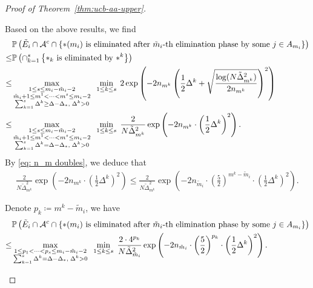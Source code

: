 \documentclass[11pt]{article}
\begin{document}
\begin{proof}[Proof of Theorem~\ref{thm:ucb-aa-upper}]
\begin{itemize}
Based on the above results, we find
\begin{align}
&\mathbb{P}\left(\tilde{E}_i\cap\mathcal{A}^c\cap\left\{\text{$*(m_i)$ is eliminated after $\tilde{m}_i$-th elimination phase } \text{by some }j\in A_{m_i}\right\}\right)\notag\\
    \leq &\mathbb{P}\left(\cap_{k=1}^{s} \left\{\text{$*_k$ is eliminated by $*^k$}\right\} \right)\notag\\
    \leq &\max_{\substack{1\leq s\leq m_i-\tilde{m}_i-2\\\tilde{m}_i+1\leq m^1<\cdots <m^{s}\leq m_i-2\\ \sum _{k=1}^{s}\Delta^k\geq \Delta-\Delta_*,\; \Delta^k>0}}\;\;\min_{1\leq k\leq s}\;2\exp\left(-2n_{m^k}\left(\frac{1}{2}\Delta^k +\sqrt{\frac{\log(N \tilde{\Delta}_{m^k}^2)}{2n_{m^k}}}\right)^2\right)\notag\\
    \leq & \max_{\substack{1\leq s\leq m_i-\tilde{m}_i-2\\\tilde{m}_i+1\leq m^1<\cdots <m^{s}\leq m_i-2\\ \sum _{k=1}^{s}\Delta^k= \Delta-\Delta_*,\; \Delta^k>0}}\;\;\min_{1\leq k\leq s}\;\frac{2}{N\tilde{\Delta}_{m^k}^2}\exp\left(-2n_{m^k}\cdot \left(\frac{1}{2}\Delta^{k}\right)^2\right).
    \label{eq: A-3 G-3 b2 optimization problem}
\end{align}
By \eqref{eq: n_m doubles}, we deduce that
\begin{align*}
    \frac{2}{N\tilde{\Delta}_{m^k}^2}\exp\left(-2n_{m^k}\cdot \left(\frac{1}{2}\Delta^{k}\right)^2\right)\leq \frac{2}{N\tilde{\Delta}_{m^k}^2}\exp\left(-2n_{\tilde{m}_i}\cdot \left(\frac{5}{2}\right)^{m^k-\tilde{m}_i}\cdot \left(\frac{1}{2}\Delta^{k}\right)^2\right).
\end{align*}

Denote $p_k\coloneqq m^k-\tilde{m}_i$, we have
\begin{align}
&\mathbb{P}\left(\tilde{E}_i\cap\mathcal{A}^c\cap\left\{\text{$*(m_i)$ is eliminated after $\tilde{m}_i$-th elimination phase } \text{by some }j\in A_{m_i}\right\}\right)\notag\\
    \leq &\max_{\substack{1\leq p_1<\cdots <p_{s}\leq m_i-\tilde{m}_i-2\\ \sum _{k=1}^{s}\Delta^k= \Delta-\Delta_*,\; \Delta^k>0}}\;\;\min_{1\leq k\leq s}\;\frac{2\cdot 4^{p_k}}{N\tilde{\Delta}_{\tilde{m}_i}^2}\exp\left(-2n_{\tilde{m}_i}\cdot \left(\frac{5}{2}\right)^{p_k}\cdot \left(\frac{1}{2}\Delta^{k}\right)^2\right).
    \label{eq: A-3 G-3 b2 optimization new}
\end{align}


\end{itemize}
\end{proof}
\end{document}
